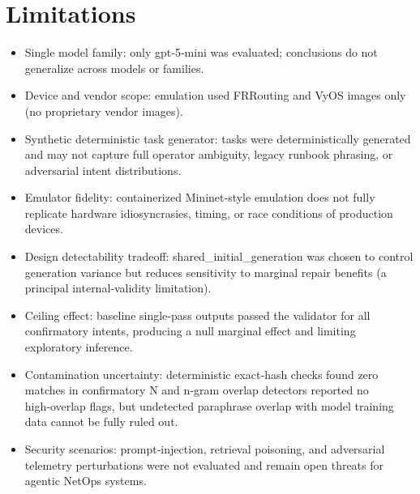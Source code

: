 \documentclass[conference]{IEEEtran}
\begin{document}
\section{Limitations}
\begin{itemize}
\item Single model family: only gpt‑5‑mini was evaluated; conclusions do not generalize across models or families.
\item Device and vendor scope: emulation used FRRouting and VyOS images only (no proprietary vendor images).
\item Synthetic deterministic task generator: tasks were deterministically generated and may not capture full operator ambiguity, legacy runbook phrasing, or adversarial intent distributions.
\item Emulator fidelity: containerized Mininet‑style emulation does not fully replicate hardware idiosyncrasies, timing, or race conditions of production devices.
\item Design detectability tradeoff: shared\_initial\_generation was chosen to control generation variance but reduces sensitivity to marginal repair benefits (a principal internal‑validity limitation).
\item Ceiling effect: baseline single‑pass outputs passed the validator for all confirmatory intents, producing a null marginal effect and limiting exploratory inference.
\item Contamination uncertainty: deterministic exact‑hash checks found zero matches in confirmatory N and n‑gram overlap detectors reported no high‑overlap flags, but undetected paraphrase overlap with model training data cannot be fully ruled out.
\item Security scenarios: prompt‑injection, retrieval poisoning, and adversarial telemetry perturbations were not evaluated and remain open threats for agentic NetOps systems.
\end{itemize}
\end{document}
